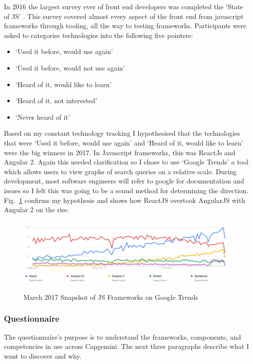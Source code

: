 In 2016 the largest survey ever of front end developers was completed the
'State of JS' \citep{StateOfJs}. This survey covered almost every aspect of the front end
from javascript frameworks through tooling, all the way to testing frameworks.
Participants were asked to categorise technologies into the following five
pointers:
 \begin{itemize}
  \item `Used it before, would use again'
  \item `Used it before, would not use again'
  \item `Heard of it, would like to learn'
  \item `Heard of it, not interested'
  \item `Never heard of it'
 \end{itemize}

Based on my constant technology tracking I hypothesised that the technologies
that were `Used it before, would use again' and `Heard of it, would like to
learn' were the big winners in 2017. In Javascript frameworks, this was ReactJs
and Angular 2. Again this needed clarification so I chose to use `Google
Trends' \citep{GoogleTrends} a tool which allows users to view graphs of
search queries on a
relative scale. During development, most software engineers will
refer to google for documentation and issues so I felt this was going to be a
sound method for determining the direction. Fig.~\ref{fig:js_compare} confirms my
hypothesis and shows how ReactJS overtook AngularJS with Angular 2 on the rise.

\begin{figure}[H]
\centering
\centering
\includegraphics[width=\textwidth]{figures/js_compare}
\includegraphics[width=\textwidth]{figures/js_compare_key}
\captionsetup{justification=centering}
\caption{March 2017 Snapshot of JS Frameworks on Google Trends
\label{fig:js_compare}}
\end{figure}

\subsubsection{Questionnaire}
The questionnaire's purpose is to understand the frameworks, components, and
competencies in use across Capgemini. The next three paragraphs describe what
I want to discover and why.


